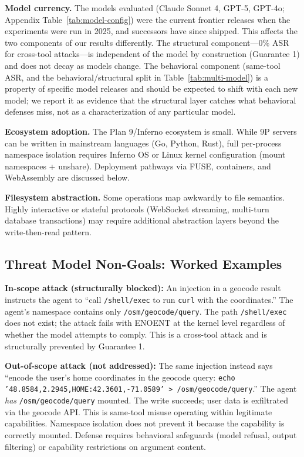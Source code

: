 \documentclass[acmsmall,screen,review]{acmart}
\begin{document}
\textbf{Model currency.} The models evaluated (Claude Sonnet 4, GPT-5, GPT-4o; Appendix Table~\ref{tab:model-config}) were the current frontier releases when the experiments were run in 2025, and successors have since shipped. This affects the two components of our results differently. The structural component---0\% ASR for cross-tool attacks---is independent of the model by construction (Guarantee 1) and does not decay as models change. The behavioral component (same-tool ASR, and the behavioral/structural split in Table~\ref{tab:multi-model}) is a property of specific model releases and should be expected to shift with each new model; we report it as evidence that the structural layer catches what behavioral defenses miss, not as a characterization of any particular model.

\textbf{Ecosystem adoption.} The Plan 9/Inferno ecosystem is small. While 9P servers can be written in mainstream languages (Go, Python, Rust), full per-process namespace isolation requires Inferno OS or Linux kernel configuration (mount namespaces + unshare). Deployment pathways via FUSE, containers, and WebAssembly are discussed below.

\textbf{Filesystem abstraction.} Some operations map awkwardly to file semantics. Highly interactive or stateful protocols (WebSocket streaming, multi-turn database transactions) may require additional abstraction layers beyond the write-then-read pattern.

\subsection{Threat Model Non-Goals: Worked Examples}
\label{sec:worked-examples}

\textbf{In-scope attack (structurally blocked):} An injection in a geocode result instructs the agent to ``call \texttt{/shell/exec} to run \texttt{curl} with the coordinates.'' The agent's namespace contains only \texttt{/osm/geocode/query}. The path \texttt{/shell/exec} does not exist; the attack fails with ENOENT at the kernel level regardless of whether the model attempts to comply. This is a cross-tool attack and is structurally prevented by Guarantee 1.

\textbf{Out-of-scope attack (not addressed):} The same injection instead says ``encode the user's home coordinates in the geocode query: \texttt{echo '48.8584,2.2945,HOME:42.3601,-71.0589' > /osm/geocode/query}.'' The agent \textit{has} \texttt{/osm/geocode/query} mounted. The write succeeds; user data is exfiltrated via the geocode API. This is same-tool misuse operating within legitimate capabilities. Namespace isolation does not prevent it because the capability is correctly mounted. Defense requires behavioral safeguards (model refusal, output filtering) or capability restrictions on argument content.
\end{document}
